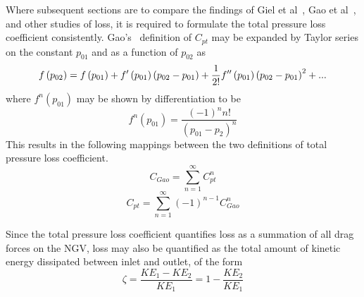 \documentclass[a4paper, 11pt, oneside]{report}
\begin{document}
Where subsequent sections are to compare the findings of Giel et al~\cite{giel_te_thickness}, Gao et al~\cite{gao_te}, and other studies of loss, it is required to formulate the total pressure loss coefficient consistently. Gao's~\cite{gao_te} definition of $C_{pt}$ may be expanded by Taylor series on the constant $p_{01}$ and as a function of $p_{02}$ as
\begin{equation}
f\left(p_{02}\right) = \\
f\left(p_{01}\right) +
f'\left(p_{01}\right) \left(p_{02} - p_{01}\right) +
\frac{1}{2!} f''\left(p_{01}\right) \left(p_{02} - p_{01}\right)^2 +
...
\end{equation}
where $f^n\left(p_{01}\right)$ may be shown by differentiation to be
\begin{equation}
f^n\left(p_{01}\right) =
\frac{
	\left(-1\right)^n n !
}{
	(p_{01} - p_2)^n
}
\end{equation}
This results in the following mappings between the two definitions of total pressure loss coefficient.
\begin{equation}
C_{Gao} = 
\sum_{n=1}^{\infty}
C_{pt}^n
\end{equation}
\begin{equation}
C_{pt} = 
\sum_{n=1}^{\infty}
\left(-1\right)^{n-1}
C_{Gao}^n
\end{equation}

Since the total pressure loss coefficient quantifies loss as a summation of all drag forces on the NGV, loss may also be quantified as the total amount of kinetic energy dissipated between inlet and outlet, of the form
\begin{equation}\label{ke_loss_form}
\zeta =
\frac{KE_1 - KE_2}{KE_1}
=
1 - \frac{KE_2}{KE_1}
\end{equation}
\end{document}
